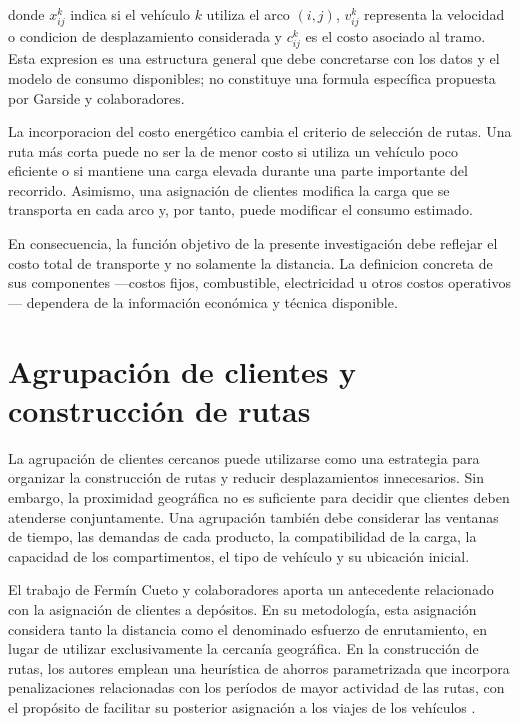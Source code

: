 \noindent donde $x_{ij}^{k}$ indica si el vehículo $k$ utiliza el arco $(i,j)$, $v_{ij}^{k}$ representa la velocidad o condicion de desplazamiento considerada y $c_{ij}^{k}$ es el costo asociado al tramo. Esta expresion es una estructura general que debe concretarse con los datos y el modelo de consumo disponibles; no constituye una formula específica propuesta por Garside y colaboradores.

La incorporacion del costo energético cambia el criterio de selección de rutas. Una ruta más corta puede no ser la de menor costo si utiliza un vehículo poco eficiente o si mantiene una carga elevada durante una parte importante del recorrido. Asimismo, una asignación de clientes modifica la carga que se transporta en cada arco y, por tanto, puede modificar el consumo estimado.

En consecuencia, la función objetivo de la presente investigación debe reflejar el costo total de transporte y no solamente la distancia. La definicion concreta de sus componentes —costos fijos, combustible, electricidad u otros costos operativos— dependera de la información económica y técnica disponible.

\section{Agrupación de clientes y construcción de rutas}
\label{sec:agrupación}

La agrupación de clientes cercanos puede utilizarse como una estrategia para organizar la construcción de rutas y reducir desplazamientos innecesarios. Sin embargo, la proximidad geográfica no es suficiente para decidir que clientes deben atenderse conjuntamente. Una agrupación también debe considerar las ventanas de tiempo, las demandas de cada producto, la compatibilidad de la carga, la capacidad de los compartimentos, el tipo de vehículo y su ubicación inicial.

El trabajo de Fermín Cueto y colaboradores aporta un antecedente relacionado con la asignación de clientes a depósitos. En su metodología, esta asignación considera tanto la distancia como el denominado esfuerzo de enrutamiento, en lugar de utilizar exclusivamente la cercanía geográfica. En la construcción de rutas, los autores emplean una heurística de ahorros parametrizada que incorpora penalizaciones relacionadas con los períodos de mayor actividad de las rutas, con el propósito de facilitar su posterior asignación a los viajes de los vehículos \cite{fermincueto2021}.

